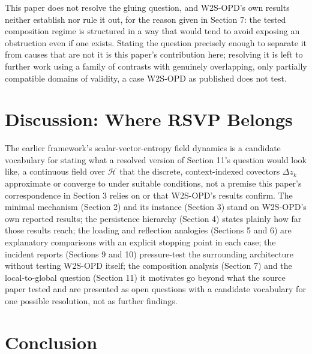 \documentclass[11pt]{article}
\begin{document}
This paper does not resolve the gluing question, and W2S-OPD's own results neither establish nor rule it out, for the reason given in Section 7: the tested composition regime is structured in a way that would tend to avoid exposing an obstruction even if one exists. Stating the question precisely enough to separate it from causes that are not it is this paper's contribution here; resolving it is left to further work using a family of contrasts with genuinely overlapping, only partially compatible domains of validity, a case W2S-OPD as published does not test.

\section{Discussion: Where RSVP Belongs}

The earlier framework's scalar-vector-entropy field dynamics is a candidate vocabulary for stating what a resolved version of Section 11's question would look like, a continuous field over $\mathcal{H}$ that the discrete, context-indexed covectors $\Delta z_k$ approximate or converge to under suitable conditions, not a premise this paper's correspondence in Section 3 relies on or that W2S-OPD's results confirm. The minimal mechanism (Section 2) and its instance (Section 3) stand on W2S-OPD's own reported results; the persistence hierarchy (Section 4) states plainly how far those results reach; the loading and reflection analogies (Sections 5 and 6) are explanatory comparisons with an explicit stopping point in each case; the incident reports (Sections 9 and 10) pressure-test the surrounding architecture without testing W2S-OPD itself; the composition analysis (Section 7) and the local-to-global question (Section 11) it motivates go beyond what the source paper tested and are presented as open questions with a candidate vocabulary for one possible resolution, not as further findings.

\section{Conclusion}
\end{document}
